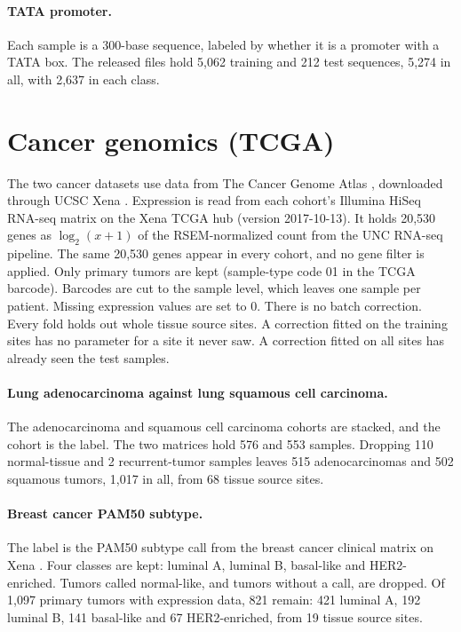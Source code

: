 \paragraph{TATA promoter.} Each sample is a 300-base sequence, labeled by whether it is a promoter with a TATA box. The released files hold 5,062 training and 212 test sequences, 5,274 in all, with 2,637 in each class.

\section{Cancer genomics (TCGA)}\label{app:datasets:tcga}

The two cancer datasets use data from The Cancer Genome Atlas \citep{Weinstein2013}, downloaded through UCSC Xena \citep{Goldman2020}. Expression is read from each cohort's Illumina HiSeq RNA-seq matrix on the Xena TCGA hub (version 2017-10-13). It holds 20,530 genes as $\log_2(x+1)$ of the RSEM-normalized count \citep{Li2011RSEM} from the UNC RNA-seq pipeline. The same 20,530 genes appear in every cohort, and no gene filter is applied. Only primary tumors are kept (sample-type code 01 in the TCGA barcode). Barcodes are cut to the sample level, which leaves one sample per patient. Missing expression values are set to 0. There is no batch correction. Every fold holds out whole tissue source sites. A correction fitted on the training sites has no parameter for a site it never saw. A correction fitted on all sites has already seen the test samples.

\paragraph{Lung adenocarcinoma against lung squamous cell carcinoma.} The adenocarcinoma \citep{TCGA2014LUAD} and squamous cell carcinoma \citep{TCGA2012LUSC} cohorts are stacked, and the cohort is the label. The two matrices hold 576 and 553 samples. Dropping 110 normal-tissue and 2 recurrent-tumor samples leaves 515 adenocarcinomas and 502 squamous tumors, 1,017 in all, from 68 tissue source sites.

\paragraph{Breast cancer PAM50 subtype.} The label is the PAM50 subtype call \citep{Parker2009} from the breast cancer clinical matrix on Xena \citep{TCGA2012BRCA}. Four classes are kept: luminal A, luminal B, basal-like and HER2-enriched. Tumors called normal-like, and tumors without a call, are dropped. Of 1,097 primary tumors with expression data, 821 remain: 421 luminal A, 192 luminal B, 141 basal-like and 67 HER2-enriched, from 19 tissue source sites.
